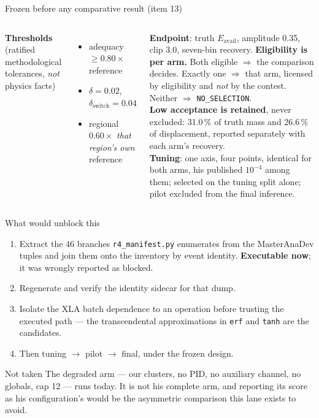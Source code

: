 \documentclass[aspectratio=169,10pt]{beamer}
\begin{document}
\begin{frame}{Frozen before any comparative result (item 13)}
\begin{columns}[T]
\small
\textbf{Thresholds} (ratified methodological tolerances, \emph{not} physics facts)
\begin{itemize}\small
\item adequacy $\ge 0.80\times$ reference
\item $\delta = 0.02$, $\delta_{\text{switch}} = 0.04$
\item regional $0.60\times$ \emph{that region's own} reference
\end{itemize}
\textbf{Endpoint}: truth $E_{\text{avail}}$, amplitude 0.35, clip 3.0, seven-bin
recovery.
\small
\textbf{Eligibility is per arm.} Both eligible $\Rightarrow$ the comparison
decides. Exactly one $\Rightarrow$ that arm, licensed by eligibility and
\emph{not} by the contest. Neither $\Rightarrow$ \texttt{NO\_SELECTION}.
\\[4pt]
\textbf{Low acceptance is retained}, never excluded: 31.0\,\% of truth mass and
26.6\,\% of displacement, reported separately with each arm's recovery.
\\[4pt]
\textbf{Tuning}: one axis, four points, identical for both arms, his published
$10^{-4}$ among them; selected on the tuning split alone; pilot excluded from the
final inference.
\end{columns}
\end{frame}

\begin{frame}{What would unblock this}
\begin{enumerate}
\item Extract the 46 branches \texttt{r4\_manifest.py} enumerates from the
      MasterAnaDev tuples and join them onto the inventory by event identity.
      \textbf{Executable now}; it was wrongly reported as blocked.
\item Regenerate and verify the identity sidecar for that dump.
\item Isolate the XLA batch dependence to an operation before trusting the
      executed path --- the transcendental approximations in \texttt{erf} and
      \texttt{tanh} are the candidates.
\item Then tuning $\rightarrow$ pilot $\rightarrow$ final, under the frozen design.
\end{enumerate}
\vfill
\begin{block}{Not taken}
The degraded arm --- our clusters, no PID, no auxiliary channel, no globals,
cap 12 --- runs today. It is not his complete arm, and reporting its score as his
configuration's would be the asymmetric comparison this lane exists to avoid.
\end{block}
\end{frame}
\end{document}
